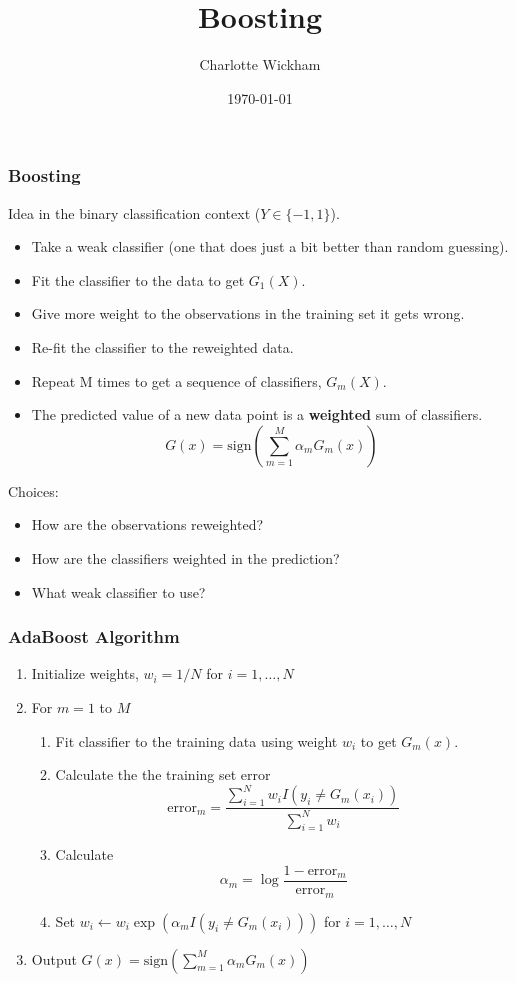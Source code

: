 \documentclass{beamer}
\title{Boosting}
\author{Charlotte Wickham}
\date{\today}
\begin{document}
\frame{\titlepage}

\begin{frame}
	\frametitle{Boosting}
	Idea in the binary classification context ($Y \in \{-1,1\}$).
	\begin{itemize}
		\item Take a weak classifier (one that does just a bit better than random guessing).
		\item Fit the classifier to the data to get $G_1(X)$.
		\item Give more weight to the observations in the training set it gets wrong.
		\item Re-fit the classifier to the reweighted data.
		\item Repeat M times to get a sequence of classifiers, $G_m(X)$.
		\item The predicted value of a new data point is a \textbf{weighted} sum of classifiers. 
		\[
		G(x) = \text{sign} \left( \sum_{m=1}^M{\alpha_m G_m(x)} \right)
		\]
	\end{itemize}
\end{frame}

\begin{frame}
	Choices:
	\begin{itemize}
		\item How are the observations reweighted?
		\item How are the classifiers weighted in the prediction?
		\item What weak classifier to use?
	\end{itemize}
\end{frame}

\begin{frame}
	\frametitle{AdaBoost Algorithm}
	\begin{enumerate}
		\item Initialize weights, $w_i = 1/N$ for $i = 1,\ldots, N$
		\item For $m=1$ to $M$
		\begin{enumerate}
			\item Fit classifier to the training data using weight $w_i$ to get $G_m(x)$.
			\item Calculate the the training set error
			\[
			\text{error}_m = \frac{\sum_{i=1}^N w_i I(y_i \ne G_m(x_i))}{\sum_{i=1}^N w_i}
			\]
			\item Calculate
			\[
			\alpha_m = \log{\frac{1 - \text{error}_m}{\text{error}_m}}
			\]
			\item Set $w_i \leftarrow  w_i \exp(\alpha_m I(y_i \ne G_m(x_i)))$ for $i=1,\ldots, N$
			\end{enumerate}	
		\item Output $G(x) = \text{sign} \left( \sum_{m=1}^M{\alpha_m G_m(x)} \right)$	
	\end{enumerate}
\end{frame}
\end{document}
